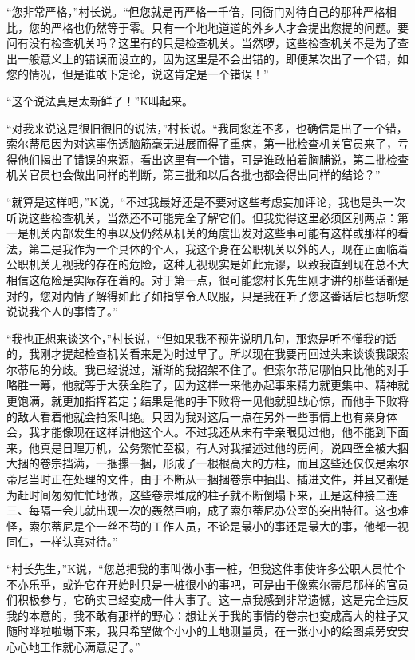 \documentclass[12pt,a4paper]{article}
\begin{document}
“您非常严格，”村长说。“但您就是再严格一千倍，同衙门对待自己的那种严格相比，您的严格也仍然等于零。只有一个地地道道的外乡人才会提出您提的问题。要问有没有检查机关吗？这里有的只是检查机关。当然啰，这些检查机关不是为了查出一般意义上的错误而设立的，因为这里是不会出错的，即便某次出了一个错，如您的情况，但是谁敢下定论，说这肯定是一个错误！”



“这个说法真是太新鲜了！”K叫起来。



“对我来说这是很旧很旧的说法，”村长说。“我同您差不多，也确信是出了一个错，索尔蒂尼因为对这事伤透脑筋毫无进展而得了重病，第一批检查机关官员来了，亏得他们揭出了错误的来源，看出这里有一个错，可是谁敢拍着胸脯说，第二批检查机关官员也会做出同样的判断，第三批和以后各批也都会得出同样的结论？”



“就算是这样吧，”K说，“不过我最好还是不要对这些考虑妄加评论，我也是头一次听说这些检查机关，当然还不可能完全了解它们。但我觉得这里必须区别两点：第一是机关内部发生的事以及仍然从机关的角度出发对这些事可能有这样或那样的看法，第二是我作为一个具体的个人，我这个身在公职机关以外的人，现在正面临着公职机关无视我的存在的危险，这种无视现实是如此荒谬，以致我直到现在总不大相信这危险是实际存在着的。对于第一点，很可能您村长先生刚才讲的那些话都是对的，您对内情了解得如此了如指掌令人叹服，只是我在听了您这番话后也想听您说说我个人的事情了。”



“我也正想来谈这个，”村长说，“但如果我不预先说明几句，那您是听不懂我的话的，我刚才提起检查机关看来是为时过早了。所以现在我要再回过头来谈谈我跟索尔蒂尼的分歧。我已经说过，渐渐的我招架不住了。但索尔蒂尼哪怕只比他的对手略胜一筹，他就等于大获全胜了，因为这样一来他办起事来精力就更集中、精神就更饱满，就更加指挥若定；结果是他的手下败将一见他就胆战心惊，而他手下败将的敌人看着他就会拍案叫绝。只因为我对这后一点在另外一些事情上也有亲身体会，我才能像现在这样讲他这个人。不过我还从未有幸亲眼见过他，他不能到下面来，他真是日理万机，公务繁忙至极，有人对我描述过他的房间，说四壁全被大捆大捆的卷宗挡满，一捆摞一捆，形成了一根根高大的方柱，而且这些还仅仅是索尔蒂尼当时正在处理的文件，由于不断从一捆捆卷宗中抽出、插进文件，并且又都是为赶时间匆匆忙忙地做，这些卷宗堆成的柱子就不断倒塌下来，正是这种接二连三、每隔一会儿就出现一次的轰然巨响，成了索尔蒂尼办公室的突出特征。这也难怪，索尔蒂尼是个一丝不苟的工作人员，不论是最小的事还是最大的事，他都一视同仁，一样认真对待。”



“村长先生，”K说，“您总把我的事叫做小事一桩，但我这件事使许多公职人员忙个不亦乐乎，或许它在开始时只是一桩很小的事吧，可是由于像索尔蒂尼那样的官员们积极参与，它确实已经变成一件大事了。这一点我感到非常遗憾，这是完全违反我的本意的，我不敢有那样的野心：想让关于我的事情的卷宗也变成高大的柱子又随时哗啦啦塌下来，我只希望做个小小的土地测量员，在一张小小的绘图桌旁安安心心地工作就心满意足了。”
\end{document}
